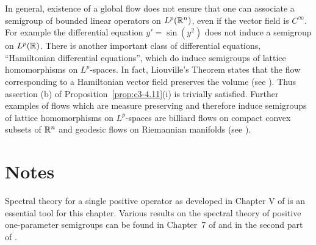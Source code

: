 In general, existence of a global flow does not ensure that one can
associate a semigroup of bounded linear operators on $L^p(\mathbb{R} ^n)$, even if
the vector field is $C^{\infty}$. For example the differential equation
$y' = \sin(y^2)$ does not induce a semigroup on $L^p(\mathbb{R} )$.
There is another important class of differential equations, \enquote{Hamiltonian differential equations}, which do induce semigroups of lattice homomorphisms on $L^p$-spaces. In fact, Liouville's Theorem states that the 
%
%
%
flow corresponding to a Hamiltonian vector field preserves the volume (see \citet[Section~3.3]{abraham:1978}). Thus assertion (b) of Proposition~\ref{prop:c3-4.11}(i) is trivially satisfied.
Further examples of flows which are measure preserving and therefore induce semigroups of lattice homomorphisms on $L^p$-spaces are billiard flows on compact convex subsets of $\mathbb{R} ^n$ and geodesic flows on Riemannian manifolds (see \citet{cornfeldetal:1982}).



\clearpage
\section*{Notes}

Spectral theory for a single positive operator as developed in Chapter V of \citet{schaefer:1974} is an essential tool for this chapter. 
Various results on the spectral theory of positive one-parameter semigroups can be found in Chapter~7 of \citet{davies:1980} and in the second part of \citet{battyrobinson:1984}.

